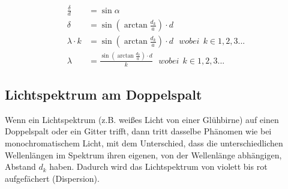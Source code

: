 	\begin{align}
		\frac{\delta}{d} &= \sin{\alpha} \\
		 \delta &= \sin{(\arctan{\frac{d_k}{a}})} \cdot d \\
		\lambda \cdot k &= \sin{(\arctan{\frac{d_k}{a}})} \cdot d \ \ \ wobei \ \ k \in 1,2,3... \\
		\lambda &= \frac{\sin{(\arctan{\frac{d_k}{a}})} \cdot d}{k} \ \ \ wobei \ \ k \in 1,2,3...
	\end{align}


\subsection{Lichtspektrum am Doppelspalt}

Wenn ein Lichtspektrum (z.B. weißes Licht von einer Glühbirne) auf einen Doppelspalt oder ein Gitter trifft, dann tritt dasselbe Phänomen wie bei monochromatischem Licht, mit dem Unterschied, dass die unterschiedlichen Wellenlängen im Spektrum ihren eigenen, von der Wellenlänge abhängigen, Abstand $d_k$ haben. Dadurch wird das Lichtspektrum von violett bis rot aufgefächert (Dispersion).










